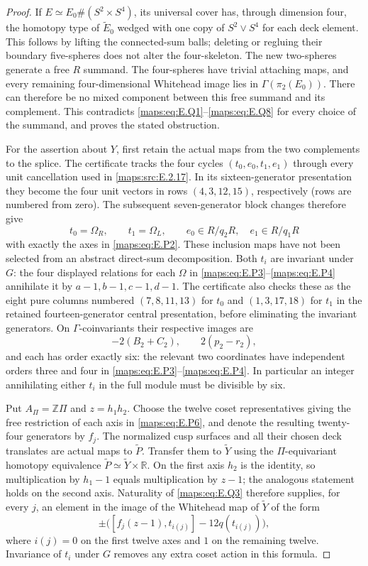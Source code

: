 \begin{proof}
If $E\simeq E_0\#(S^2\times S^4)$, its universal cover
has, through dimension four, the homotopy type of
$\widetilde E_0$ wedged with one copy of $S^2\vee S^4$
for each deck element.  This follows by lifting the
connected-sum balls; deleting or regluing their boundary
five-spheres does not alter the four-skeleton.  The new
two-spheres generate a free $R$ summand.  The four-spheres
have trivial attaching maps, and every remaining
four-dimensional Whitehead image lies in
$\Gamma(\pi_2(E_0))$.  There can therefore be no mixed
component between this free summand and its complement.
This contradicts \eqref{maps:eq:E.Q1}--\eqref{maps:eq:E.Q8} for every choice of the
summand, and proves the stated obstruction.

For the assertion about $Y$, first retain the actual maps
from the two complements to the splice.  The certificate
 tracks the four cycles
$(t_0,e_0,t_1,e_1)$ through every unit cancellation used in
\ref{maps:src:E.2.17}.  In its sixteen-generator presentation they become
the four unit vectors in rows $(4,3,12,15)$, respectively
(rows are numbered from zero).  The subsequent seven-generator
block changes therefore give
\[
 t_0=\Omega_R,\qquad t_1=\Omega_L,
 \qquad e_0\in R/q_2R,\quad e_1\in R/q_1R
 \tag{E.Q9}\label{maps:eq:E.Q9}
\]
with exactly the axes in \eqref{maps:eq:E.P2}.  These inclusion maps have
not been selected from an abstract direct-sum decomposition.
Both $t_i$ are invariant under $G$: the four displayed
relations for each $\Omega$ in \eqref{maps:eq:E.P3}--\eqref{maps:eq:E.P4} annihilate
it by $a-1,b-1,c-1,d-1$.  The certificate also checks these
as the eight pure columns numbered
$(7,8,11,13)$ for $t_0$ and $(1,3,17,18)$ for $t_1$
in the retained fourteen-generator central presentation,
before eliminating the invariant generators.
On $\Gamma$-coinvariants
their respective images are
\[
 -2(B_2+C_2),\qquad 2(p_2-r_2),
 \tag{E.Q10}\label{maps:eq:E.Q10}
\]
and each has order exactly six: the relevant two coordinates
have independent orders three and four in \eqref{maps:eq:E.P3}--\eqref{maps:eq:E.P4}.
In particular an integer annihilating either $t_i$ in the
full module must be divisible by six.

Put $A_\Pi=\mathbb Z\Pi$ and $z=h_1h_2$.  Choose the twelve
coset representatives giving the free restriction of each
axis in \eqref{maps:eq:E.P6}, and denote the resulting twenty-four generators
by $f_j$.  The normalized cusp surfaces and all their chosen
deck translates are actual maps to $\widetilde P$.  Transfer
them to $\widetilde Y$ using the $\Pi$-equivariant homotopy
equivalence $\widetilde P\simeq\widetilde Y\times\mathbb R$.
On the first axis $h_2$ is the identity, so multiplication
by $h_1-1$ equals multiplication by $z-1$; the analogous
statement holds on the second axis.  Naturality of \eqref{maps:eq:E.Q3}
therefore supplies, for every $j$, an element in the image
of the Whitehead map of $\widetilde Y$ of the form
\[
 \pm\bigl([f_j(z-1),t_{i(j)}]-12q(t_{i(j)})\bigr),
 \tag{E.Q11}\label{maps:eq:E.Q11}
\]
where $i(j)=0$ on the first twelve axes and $1$ on the
remaining twelve.  Invariance of $t_i$ under $G$ removes
any extra coset action in this formula.


\end{proof}
